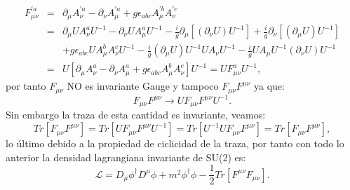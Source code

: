 \begin{eqnarray}
\nonumber F_{\mu\nu}^{\prime a}&=&\partial_{\mu}A_{\nu}^{\prime a}-\partial_{\nu}A_{\mu}^{\prime a}+g\epsilon_{abc}A_{\mu}^{\prime b}A_{\nu}^{\prime c}\\
\nonumber &=& \partial_{\mu}UA_{\nu}^{a}U^{-1}-\partial_{\nu}UA_{\mu}^{a}U^{-1}-\frac{i}{g}\partial_{\mu}[(\partial_{\nu}U)U^{-1}]+\frac{i}{g}\partial_{\nu}[(\partial_{\mu}U)U^{-1}]\\
\nonumber && +g\epsilon_{abc}UA_{\mu}^{b}A_{\nu}^{c}U^{-1}-\frac{i}{g}(\partial_{\mu}U)U^{-1}UA_{\nu}U^{-1}-\frac{i}{g}UA_{\mu}U^{-1}(\partial_{\nu}U)U^{-1}\\
&=& U[\partial_{\mu}A_{\nu}^{a}-\partial_{\nu}A_{\mu}^{a}+g\epsilon_{abc}A_{\mu}^{b}A_{\nu}^{c}]U^{-1}=UF_{\mu\nu}^{a}U^{-1} ,
\end{eqnarray}
por tanto $F_{\mu\nu}$ NO es invariante Gauge y tampoco $F_{\mu\nu}F^{\mu\nu}$ ya que:
\begin{equation}
F_{\mu\nu}F^{\mu\nu}\to UF_{\mu\nu}F^{\mu\nu} U^{-1}.
\end{equation}
Sin embargo la traza de esta cantidad es invariante, veamos:
\begin{equation}
Tr[F_{\mu\nu}F^{\mu\nu}]= Tr[UF_{\mu\nu}F^{\mu\nu} U^{-1}]=Tr[U^{-1}UF_{\mu\nu}F^{\mu\nu}]=Tr[F_{\mu\nu}F^{\mu\nu}],
\end{equation}
lo último debido a la propiedad de ciclicidad de la traza, por tanto con todo lo anterior la densidad lagrangiana invariante de SU(2) es:
\begin{equation}
\mathcal{L}=D_{\mu}\phi^{\dagger}D^{\mu}\phi+m^{2}\phi^{\dagger}\phi-\frac{1}{2}Tr[F^{\mu\nu}F_{\mu\nu}].
\end{equation}








